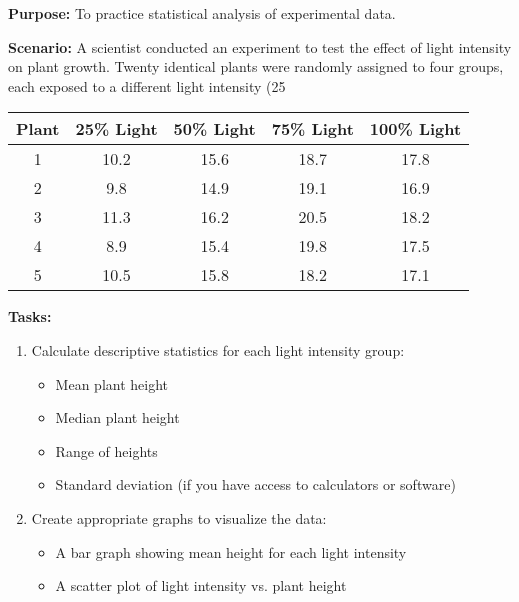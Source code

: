 \documentclass[justified,notoc]{tufte-book}
\newenvironment{investigation}[1]{%
    \begin{tcolorbox}[colback=info!10,colframe=info,title=\textbf{Investigation: #1}]
}{%
    \end{tcolorbox}
}
\begin{document}
\begin{investigation}{Analyzing Scientific Data}
\textbf{Purpose:} To practice statistical analysis of experimental data.

\textbf{Scenario:} A scientist conducted an experiment to test the effect of light intensity on plant growth. Twenty identical plants were randomly assigned to four groups, each exposed to a different light intensity (25%

\begin{center}
\begin{tabular}{|c|c|c|c|c|}
\hline
\textbf{Plant} & \textbf{25\% Light} & \textbf{50\% Light} & \textbf{75\% Light} & \textbf{100\% Light} \\
\hline
1 & 10.2 & 15.6 & 18.7 & 17.8 \\
\hline
2 & 9.8 & 14.9 & 19.1 & 16.9 \\
\hline
3 & 11.3 & 16.2 & 20.5 & 18.2 \\
\hline
4 & 8.9 & 15.4 & 19.8 & 17.5 \\
\hline
5 & 10.5 & 15.8 & 18.2 & 17.1 \\
\hline
\end{tabular}
\end{center}

\textbf{Tasks:}
\begin{enumerate}
    \item Calculate descriptive statistics for each light intensity group:
    \begin{itemize}
        \item Mean plant height
        \item Median plant height
        \item Range of heights
        \item Standard deviation (if you have access to calculators or software)
    \end{itemize}
    
    \item Create appropriate graphs to visualize the data:
    \begin{itemize}
        \item A bar graph showing mean height for each light intensity
        \item A scatter plot of light intensity vs. plant height
    \end{itemize}
    

\end{enumerate}
\end{investigation}
\end{document}

